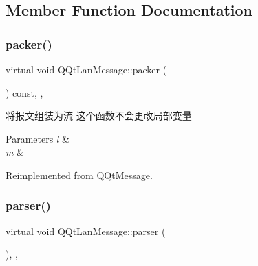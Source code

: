 \subsection{Member Function Documentation}
\mbox{\label{class_q_qt_lan_message_ad06aa6cee4485251e1c9ae53e35a2cdc}} 
\subsubsection{\texorpdfstring{packer()}{packer()}}
{\footnotesize\ttfamily virtual void Q\+Qt\+Lan\+Message\+::packer (\begin{DoxyParamCaption}\item[{Q\+Byte\+Array \&}]{ }\end{DoxyParamCaption}) const\hspace{0.3cm}{\ttfamily [inline]}, {\ttfamily [override]}, {\ttfamily [virtual]}}



将报文组装为流 这个函数不会更改局部变量 


\begin{DoxyParams}{Parameters}
{\em l} & \\
\hline
{\em m} & \\
\hline
\end{DoxyParams}


Reimplemented from \mbox{\hyperlink{class_q_qt_message_af1885c2c3628495808dca66ee8d72e14}{Q\+Qt\+Message}}.

\mbox{\label{class_q_qt_lan_message_a778629e75eb24a48b54988b25bd32250}} 
\subsubsection{\texorpdfstring{parser()}{parser()}}
{\footnotesize\ttfamily virtual void Q\+Qt\+Lan\+Message\+::parser (\begin{DoxyParamCaption}\item[{const Q\+Byte\+Array \&}]{ }\end{DoxyParamCaption})\hspace{0.3cm}{\ttfamily [inline]}, {\ttfamily [override]}, {\ttfamily [virtual]}}



